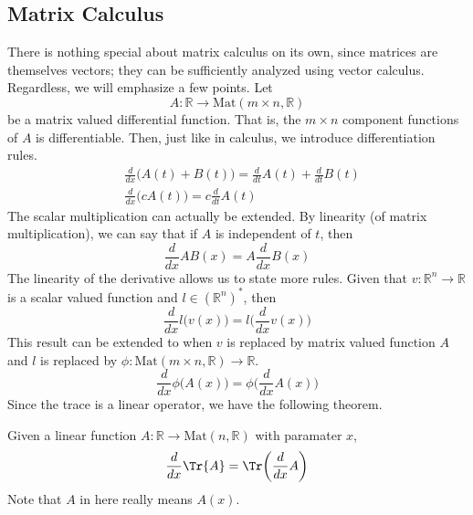 \subsection{Matrix Calculus}

  There is nothing special about matrix calculus on its own, since matrices are themselves vectors; they can be sufficiently analyzed using vector calculus. Regardless, we will emphasize a few points. Let
  \begin{equation}
    A: \mathbb{R} \longrightarrow \text{Mat}(m \times n, \mathbb{R})
  \end{equation}
  be a matrix valued differential function. That is, the $m \times n$ component functions of $A$ is differentiable. Then, just like in calculus, we introduce differentiation rules.
  \begin{align*}
    & \frac{d}{d x} \big( A(t) + B(t)\big) = \frac{d}{d t} A(t) + \frac{d}{d t} B(t) \\
    & \frac{d}{d x} \big( c A(t)\big) = c \frac{d}{d t} A(t)
  \end{align*}
  The scalar multiplication can actually be extended. By linearity (of matrix multiplication), we can say that if $A$ is independent of $t$, then 
  \begin{equation}
    \frac{d}{d x} A B (x) = A \frac{d}{d x} B(x)
  \end{equation}
  The linearity of the derivative allows us to state more rules. Given that $v: \mathbb{R}^n \longrightarrow \mathbb{R}$ is a scalar valued function and $l \in (\mathbb{R}^n)^*$, then  
  \begin{equation}
    \frac{d}{d x} l \big( v(x) \big) = l \bigg( \frac{d}{d x} v(x) \bigg)
  \end{equation}
  This result can be extended to when $v$ is replaced by matrix valued function $A$ and $l$ is replaced by $\phi: \text{Mat}(m \times n, \mathbb{R}) \longrightarrow \mathbb{R}$. 
  \begin{equation}
    \frac{d}{d x} \phi \big( A(x) \big) = \phi \bigg( \frac{d}{d x} A(x) \bigg)
  \end{equation}
  Since the trace is a linear operator, we have the following theorem. 

  \begin{theorem}
    Given a linear function $A: \mathbb{R} \longrightarrow \text{Mat}(n, \mathbb{R})$ with paramater $x$, 
    \begin{equation}
      \frac{d}{d x} \Tr{A} = \Tr \bigg( \frac{d}{d x} A \bigg)
    \end{equation}
    Note that $A$ in here really means $A(x)$.
  \end{theorem}

